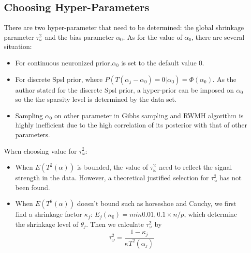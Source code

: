 \subsection{Choosing Hyper-Parameters}
There are two hyper-parameter that need to be determined: the global shrinkage parameter $\tau_\omega^2$ and the bias parameter $\alpha_0$.
As for the value of $\alpha_0$, there are several situation:
\begin{itemize}
    \item For continuous neuronized prior,$\alpha_0$ is set to the default value 0.
    \item For discrete Spsl prior, where $P(T(\alpha_j - \alpha_0) = 0|\alpha_0)=\Phi(\alpha_0)$. As the author stated for the discrete Spsl prior, a hyper-prior can be imposed on $\alpha_0$ so the the sparsity level is determined by the data set.
    \item Sampling $\alpha_0$ on other parameter in Gibbs sampling and RWMH algorithm is highly inefficient due to the high correlation of its posterior with that of other parameters.
\end{itemize}
When choosing value for $\tau_\omega^2$:
\begin{itemize}
    \item When $E (T^2(\alpha))$ is bounded, the value of $\tau_\omega^2$ need to reflect the signal strength in the data. However, a theoretical justified selection for $\tau_\omega^2$ has not been found.
    \item When $E (T^2(\alpha))$ doesn't bound such as horseshoe and Cauchy, we first find a shrinkage factor $\kappa_j$: $E_j (\kappa_0) = min{0.01,0.1 \times n/p}$, which determine the shrinkage level of $\theta_j$. Then we calculate $\tau_\omega^2$ by $$\tau_\omega^2=\frac{1-\kappa_j}{\kappa T^2(\alpha_j)}$$
\end{itemize}
